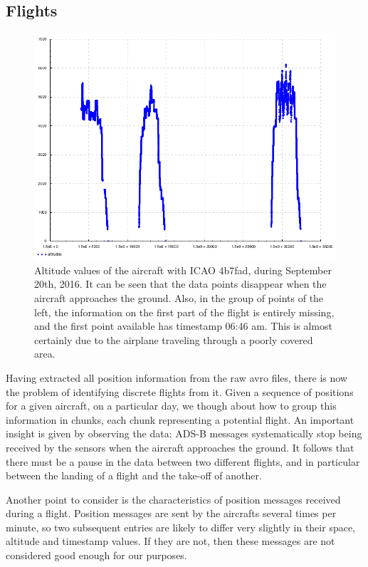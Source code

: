 \documentclass{vldb}
\begin{document}
\subsection{Flights}

\begin{figure}[h]
  \centering
  \includegraphics[scale=0.28]{imgs/4b7fad-altitudes.png}
  \caption{Altitude values of the aircraft with ICAO 4b7fad, during September
    20th, 2016. It can be seen that the data points disappear when the aircraft
    approaches the ground. Also, in the group of points of the left, the
    information on the first part of the flight is entirely missing, and the
    first point available has timestamp 06:46 am. This is almost
    certainly due to the airplane traveling through a poorly covered area.}
  \label{fig:alts}
\end{figure}

Having extracted all position information from the raw avro files, there is now
the problem of identifying discrete flights from it.
Given a sequence of positions for a given aircraft, on a particular day, we
though about how to group this information in chunks, each chunk representing a
potential flight. An important insight is given by observing the data: ADS-B
messages systematically stop being received by the sensors when the aircraft
approaches the ground. It follows that there must be a pause in the data between
two different flights, and in particular between the landing of a flight and the
take-off of another.

Another point to consider is the characteristics of position messages received
during a flight. Position messages are sent by the aircrafts several times per
minute, so two subsequent entries are likely to differ very slightly in their
space, altitude and timestamp values. If they are not, then these messages are
not considered good enough for our purposes.
\end{document}
